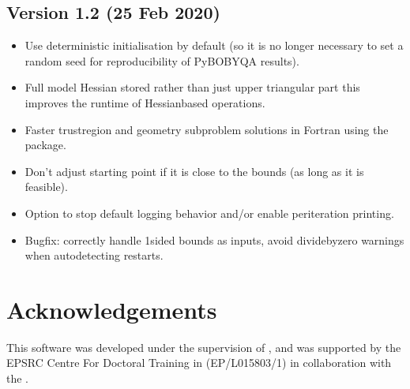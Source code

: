 \documentclass[letterpaper,10pt,english]{sphinxmanual}
\begin{document}
\section{Version 1.2 (25 Feb 2020)}
\label{\detokenize{history:version-1-2-25-feb-2020}}\begin{itemize}
\item {} 
Use deterministic initialisation by default (so it is no longer necessary to set a random seed for reproducibility of Py\sphinxhyphen{}BOBYQA results).

\item {} 
Full model Hessian stored rather than just upper triangular part \sphinxhyphen{} this improves the runtime of Hessian\sphinxhyphen{}based operations.

\item {} 
Faster trust\sphinxhyphen{}region and geometry subproblem solutions in Fortran using the  package.

\item {} 
Don’t adjust starting point if it is close to the bounds (as long as it is feasible).

\item {} 
Option to stop default logging behavior and/or enable per\sphinxhyphen{}iteration printing.

\item {} 
Bugfix: correctly handle 1\sphinxhyphen{}sided bounds as inputs, avoid divide\sphinxhyphen{}by\sphinxhyphen{}zero warnings when auto\sphinxhyphen{}detecting restarts.

\end{itemize}


\chapter{Acknowledgements}
\label{\detokenize{index:acknowledgements}}
This software was developed under the supervision of , and was supported by the EPSRC Centre For Doctoral Training in  (EP/L015803/1) in collaboration with the .
\end{document}
